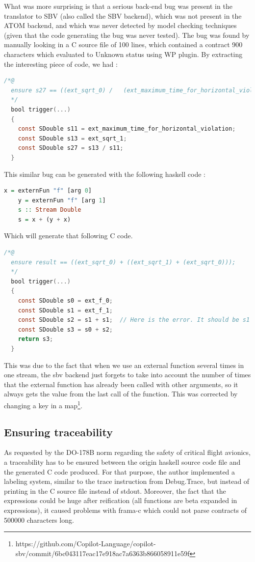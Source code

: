 \documentclass[a4paper,11pt,final]{article}
\begin{document}
  What was more surprising is that a serious back-end bug was present in the translator to SBV (also called the SBV backend), which was not present in the ATOM backend, and which was never detected by model checking techniques (given that the code generating the bug was never tested). The bug was found by manually looking in a C source file of 100 lines, which contained a contract 900 characters which evaluated to Unknown status using WP plugin. By extracting the interesting piece of code, we had :
  \begin{lstlisting}[language=C, keywordstyle=\color{blue}]
  /*@
  ensure s27 == ((ext_sqrt_0) /   (ext_maximum_time_for_horizontal_violation));
  */
  bool trigger(...)
  {
    const SDouble s11 = ext_maximum_time_for_horizontal_violation;
    const SDouble s13 = ext_sqrt_1;
    const SDouble s27 = s13 / s11;
  }  \end{lstlisting}
  This similar bug can be generated with the following haskell code :
  \begin{lstlisting}[language=Haskell]
    x = externFun "f" [arg 0]
    y = externFun "f" [arg 1]
  	s :: Stream Double
  	s = x + (y + x)
  \end{lstlisting}
  Which will generate that following C code.
  \begin{lstlisting}[language=C, keywordstyle=\color{blue}]
  /*@
  ensure result == ((ext_sqrt_0) + ((ext_sqrt_1) + (ext_sqrt_0)));
  */
  bool trigger(...)
  {
    const SDouble s0 = ext_f_0;
    const SDouble s1 = ext_f_1;
    const SDouble s2 = s1 + s1;  // Here is the error. It should be s1 + s0;
    const SDouble s3 = s0 + s2;
    return s3;
  }  \end{lstlisting}
  
  This was due to the fact that when we use an external function several times in one stream, the sbv backend just forgets to take into account the number of times that the external function has already been called with other arguments, so it always gets the value from the last call of the function. This was corrected by changing a key in a map\footnote{https://github.com/Copilot-Language/copilot-sbv/commit/6bc043117eac17e918ac7a6363b866058911e59f}. 
  
  \subsection{Ensuring traceability}
  
  As requested by the DO-178B norm regarding the safety of critical flight avionics, a traceability has to be ensured between the origin haskell source code file and the generated C code produced. For that purpose, the author implemented a labeling system, similar to the trace instruction from Debug.Trace, but instead of printing in the C source file instead of stdout. Moreover, the fact that the expressions could be huge after reification (all functions are beta expanded in expressions), it caused problems with frama-c which could not parse contracts of 500000 characters long. 
  
\end{document}
